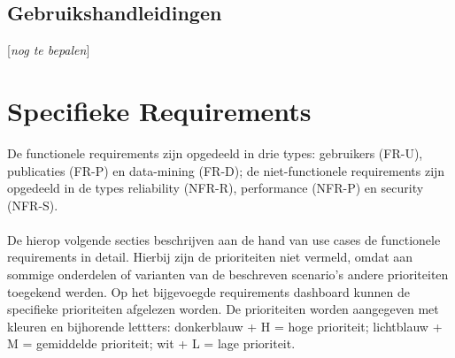 \documentclass{article}
\begin{document}
\subsection{Gebruikshandleidingen}

[{\it nog te bepalen}]


\clearpage


\section{Specifieke Requirements}
\label{sec:systemRequirements}

\noindent De functionele requirements zijn opgedeeld in drie types: gebruikers (FR-U), publicaties (FR-P) en data-mining (FR-D); de niet-functionele requirements zijn opgedeeld in de types reliability (NFR-R), performance (NFR-P) en security (NFR-S).  \\
\\
\noindent De hierop volgende secties beschrijven aan de hand van use cases de functionele requirements in detail. Hierbij zijn de prioriteiten niet vermeld, omdat aan sommige onderdelen of varianten van de beschreven scenario's andere prioriteiten toegekend werden. Op het bijgevoegde requirements dashboard kunnen de specifieke prioriteiten afgelezen worden. De prioriteiten worden aangegeven met kleuren en bijhorende lettters:  donkerblauw + H  = hoge prioriteit;  lichtblauw + M = gemiddelde prioriteit;  wit + L = lage prioriteit.




\end{document}
